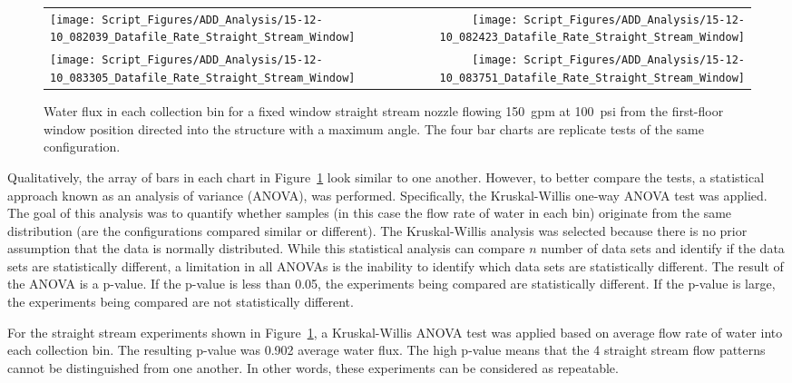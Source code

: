 \documentclass[12pt,oneside]{book}
\begin{document}
\begin{figure}[ht]
\begin{tabular*}{\textwidth}{lr}
\texttt{[image: Script\_Figures/ADD\_Analysis/15-12-10\_082039\_Datafile\_Rate\_Straight\_Stream\_Window]} &
\texttt{[image: Script\_Figures/ADD\_Analysis/15-12-10\_082423\_Datafile\_Rate\_Straight\_Stream\_Window]} \\
\texttt{[image: Script\_Figures/ADD\_Analysis/15-12-10\_083305\_Datafile\_Rate\_Straight\_Stream\_Window]} &
\texttt{[image: Script\_Figures/ADD\_Analysis/15-12-10\_083751\_Datafile\_Rate\_Straight\_Stream\_Window]} \\
\end{tabular*}
\caption[Water Flux for Straight Stream Window at Max Angle]{Water flux in each collection bin for a fixed window straight stream nozzle flowing 150~gpm at 100~psi from the first-floor window position directed into the structure with a maximum angle. The four bar charts are replicate tests of the same configuration.}
\label{fig:Repeatability_Testing}
\end{figure}

Qualitatively, the array of bars in each chart in Figure~\ref{fig:Repeatability_Testing} look similar to one another. However, to better compare the tests, a statistical approach known as an analysis of variance (ANOVA), was performed. Specifically, the Kruskal-Willis one-way ANOVA test was applied. The goal of this analysis was to quantify whether samples (in this case the flow rate of water in each bin) originate from the same distribution (are the configurations compared similar or different). The Kruskal-Willis analysis was selected because there is no prior assumption that the data is normally distributed. While this statistical analysis can compare $n$ number of data sets and identify if the data sets are statistically different, a limitation in all ANOVAs is the inability to identify which data sets are statistically different. The result of the ANOVA is a p-value. If the p-value is less than 0.05, the experiments being compared are statistically different. If the p-value is large, the experiments being compared are not statistically different.

For the straight stream experiments shown in Figure~\ref{fig:Repeatability_Testing}, a Kruskal-Willis ANOVA test was applied based on average flow rate of water into each collection bin. The resulting p-value was 0.902 average water flux. The high p-value means that the 4 straight stream flow patterns cannot be distinguished from one another. In other words, these experiments can be considered as repeatable.
\end{document}

